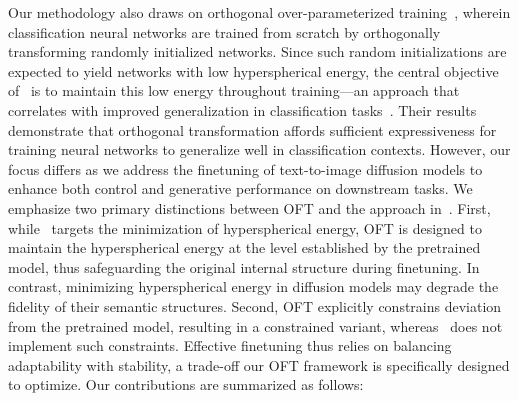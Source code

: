 Our methodology also draws on orthogonal over-parameterized training~\cite{liu2021orthogonal}, wherein classification neural networks are trained from scratch by orthogonally transforming randomly initialized networks. Since such random initializations are expected to yield networks with low hyperspherical energy, the central objective of~\cite{liu2021orthogonal} is to maintain this low energy throughout training—an approach that correlates with improved generalization in classification tasks~\cite{liu2018learning,lin2020regularizing}. Their results demonstrate that orthogonal transformation affords sufficient expressiveness for training neural networks to generalize well in classification contexts. However, our focus differs as we address the finetuning of text-to-image diffusion models to enhance both control and generative performance on downstream tasks. We emphasize two primary distinctions between OFT and the approach in~\cite{liu2021orthogonal}. First, while~\cite{liu2021orthogonal} targets the minimization of hyperspherical energy, OFT is designed to maintain the hyperspherical energy at the level established by the pretrained model, thus safeguarding the original internal structure during finetuning. In contrast, minimizing hyperspherical energy in diffusion models may degrade the fidelity of their semantic structures. Second, OFT explicitly constrains deviation from the pretrained model, resulting in a constrained variant, whereas~\cite{liu2021orthogonal} does not implement such constraints. Effective finetuning thus relies on balancing adaptability with stability, a trade-off our OFT framework is specifically designed to optimize. Our contributions are summarized as follows:

